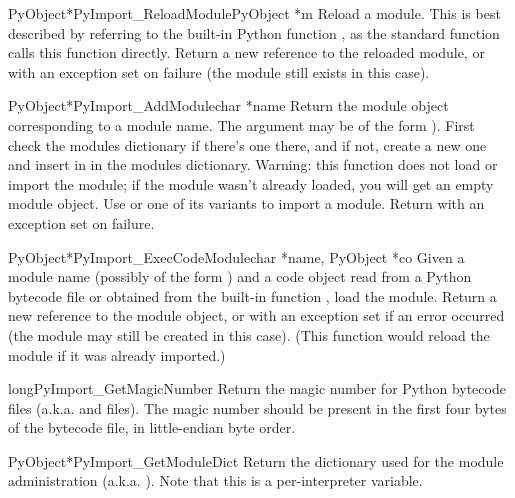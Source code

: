 \documentclass{manual}
\begin{document}
\begin{cfuncdesc}{PyObject*}{PyImport_ReloadModule}{PyObject *m}
Reload a module.  This is best described by referring to the built-in
Python function , as the standard
 function calls this function directly.  Return a
new reference to the reloaded module, or \NULL{} with an exception set
on failure (the module still exists in this case).
\end{cfuncdesc}

\begin{cfuncdesc}{PyObject*}{PyImport_AddModule}{char *name}
Return the module object corresponding to a module name.  The
 argument may be of the form ).  First
check the modules dictionary if there's one there, and if not, create
a new one and insert in in the modules dictionary.
Warning: this function does not load or import the module; if the
module wasn't already loaded, you will get an empty module object.
Use  or one of its variants to
import a module.
Return \NULL{} with an exception set on failure.
\end{cfuncdesc}

\begin{cfuncdesc}{PyObject*}{PyImport_ExecCodeModule}{char *name, PyObject *co}
Given a module name (possibly of the form ) and a
code object read from a Python bytecode file or obtained from the
built-in function , load the
module.  Return a new reference to the module object, or \NULL{} with
an exception set if an error occurred (the module may still be created
in this case).  (This function would reload the module if it was
already imported.)
\end{cfuncdesc}

\begin{cfuncdesc}{long}{PyImport_GetMagicNumber}{}
Return the magic number for Python bytecode files (a.k.a.
 and  files).  The magic number should be
present in the first four bytes of the bytecode file, in little-endian
byte order.
\end{cfuncdesc}

\begin{cfuncdesc}{PyObject*}{PyImport_GetModuleDict}{}
Return the dictionary used for the module administration
(a.k.a. ).  Note that this is a per-interpreter
variable.
\end{cfuncdesc}
\end{document}
